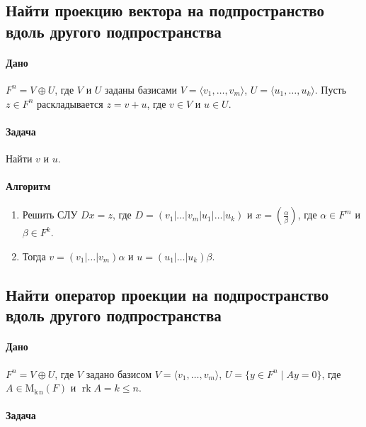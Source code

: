 \documentclass{article}
\newcommand{\MatrixDim}[3]{\operatorname{\mathrm{M}_{#2\,#3}}(#1)}
\newcommand{\rk}{\operatorname{rk}}
\begin{document}
\subsection{Найти проекцию вектора на подпространство вдоль другого подпространства}

\paragraph{Дано}

$F^{n} = V \oplus U$, где $V$ и $U$ заданы базисами $V = \langle v_1,\ldots,v_m\rangle$, $U = \langle u_1,\ldots,u_k\rangle$.
Пусть $z\in F^{n}$ раскладывается $z = v + u$, где $v\in V$ и $u\in U$.

\paragraph{Задача}

Найти $v$ и $u$.

\paragraph{Алгоритм}

\begin{enumerate}
\item Решить СЛУ $D x = z$, где $D = (v_1|\ldots|v_m|u_1|\ldots|u_k)$ и $x = \left(\frac{\alpha}{\beta}\right)$, где $\alpha\in F^{m}$ и $\beta\in F^{k}$.

\item Тогда $v = (v_1|\ldots|v_m)\alpha$ и $u = (u_1|\ldots|u_k)\beta$.
\end{enumerate}

\subsection{Найти оператор проекции на подпространство вдоль другого подпространства}

\paragraph{Дано}

$F^{n} = V \oplus U$, где $V$ задано базисом $V = \langle v_1,\ldots,v_m\rangle$, $U = \{y\in F^{n}\mid Ay = 0\}$, где $A\in \MatrixDim{F}{k}{n}$ и $\rk A = k \leqslant n$.

\paragraph{Задача}
\end{document}
